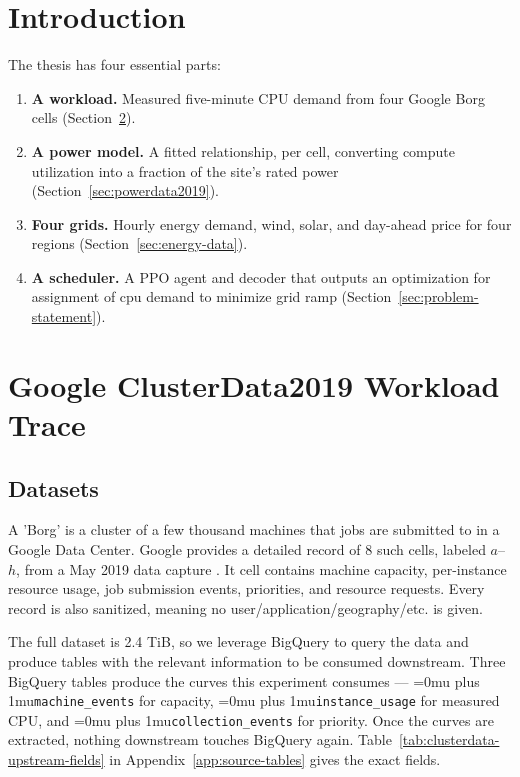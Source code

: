 \documentclass[12pt]{article}
\newcommand{\codepath}[1]{{\Urlmuskip=0mu plus 1mu\relax\nolinkurl{#1}}}
\begin{document}
\section{Introduction}
\label{sec:introduction}

The thesis has four essential parts:

\begin{enumerate}
  \item \textbf{A workload.} Measured five-minute CPU demand from four Google        Borg cells (Section~\ref{sec:clusterdata2019}).
  \item \textbf{A power model.} A fitted relationship, per cell, converting        compute utilization into a fraction of the site's rated power (Section~\ref{sec:powerdata2019}).
  \item \textbf{Four grids.} Hourly energy demand, wind, solar, and day-ahead price for four regions (Section~\ref{sec:energy-data}).
  \item \textbf{A scheduler.} A PPO agent and decoder that outputs an optimization for assignment of cpu demand to minimize grid ramp (Section~\ref{sec:problem-statement}).
\end{enumerate}

\section{Google ClusterData2019 Workload Trace}
\label{sec:clusterdata2019}

\subsection{Datasets}
\label{subsec:clusterdata-role}

A 'Borg' is a cluster of a few thousand machines that jobs are submitted to in a Google Data Center. Google provides a detailed record of 8 such cells, labeled \(a\)--\(h\), from a May 2019 data capture \cite{wilkes2020clusterdata2019}. It cell contains machine capacity, per-instance resource usage, job submission events, priorities, and resource requests. Every record is also sanitized, meaning no user/application/geography/etc. is given. 

The full dataset is 2.4 TiB, so we leverage BigQuery to query the data and produce tables with the relevant information to be consumed downstream. Three BigQuery tables produce the curves this experiment consumes --- \codepath{machine_events} for capacity, \codepath{instance_usage} for measured CPU, and \codepath{collection_events} for priority. Once the curves are extracted, nothing downstream touches BigQuery again. Table~\ref{tab:clusterdata-upstream-fields} in Appendix~\ref{app:source-tables} gives the exact fields.
\end{document}
